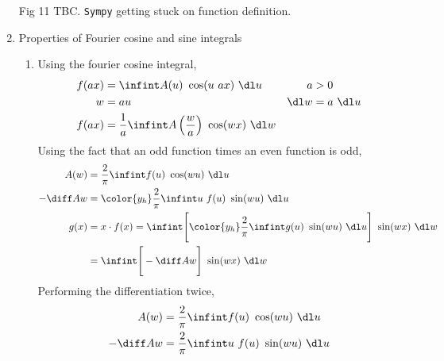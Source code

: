 \begin{enumerate}
          Fig 11 TBC. \texttt{Sympy} getting stuck on function definition.

    \item Properties of Fourier cosine and sine integrals
          \begin{enumerate}
              \item Using the fourier cosine integral,
                    \begin{align}
                        f(ax) & = \infint A(u)\ \cos(u\ ax)\ \dl u       &
                        a     & > 0                                        \\
                        w     & = au                                     &
                        \dl w & = a\ \dl u                                 \\
                        f(ax) & = \frac{1}{a}\infint A\left( \frac{w}{a}
                        \right)\ \cos(wx)\ \dl w
                    \end{align}
                    Using the fact that an odd function times an even function is odd,
                    \begin{align}
                        A(w)      & = \frac{2}{\pi} \infint f(u)\ \cos(wu)
                        \ \dl u                                                  \\
                        -\diff Aw & = \color{y_h}\frac{2}{\pi} \infint u\ f(u)
                        \ \sin(wu) \ \dl u                                       \\
                        g(x)      & = x \cdot f(x) = \infint  \Bigg[{\color{y_h}
                                    \frac{2}{\pi} \infint g(u)\ \sin(wu)\ \dl u}
                        \Bigg]\ \sin(wx)\ \dl w                                  \\
                                  & = \infint \Bigg[ -\diff Aw \Bigg]
                        \ \sin(wx)\ \dl w
                    \end{align}
                    Performing the differentiation twice,
                    \begin{align}
                        A(w)         & = \frac{2}{\pi} \infint f(u)\ \cos(wu)
                        \ \dl u                                                       \\
                        -\diff Aw    & = \frac{2}{\pi} \infint u\ f(u)
                        \ \sin(wu) \ \dl u                                            \\

\end{align}
\end{enumerate}
\end{enumerate}
